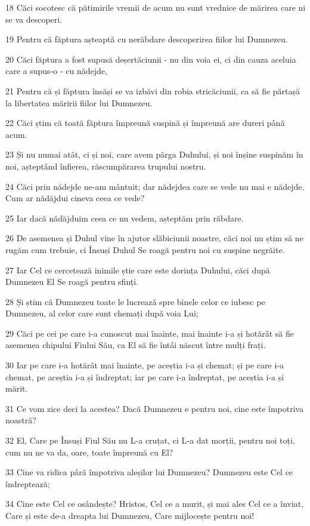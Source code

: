 \par 18 Căci socotesc că pătimirile vremii de acum nu sunt vrednice de mărirea care ni se va descoperi.
\par 19 Pentru că făptura așteaptă cu nerăbdare descoperirea fiilor lui Dumnezeu.
\par 20 Căci făptura a fost supusă deșertăciunii - nu din voia ei, ci din cauza aceluia care a supus-o - cu nădejde,
\par 21 Pentru că și făptura însăși se va izbăvi din robia stricăciunii, ca să fie părtașă la libertatea măririi fiilor lui Dumnezeu.
\par 22 Căci știm că toată făptura împreună suspină și împreună are dureri până acum.
\par 23 Și nu numai atât, ci și noi, care avem pârga Duhului, și noi înșine suspinăm în noi, așteptând înfierea, răscumpărarea trupului nostru.
\par 24 Căci prin nădejde ne-am mântuit; dar nădejdea care se vede nu mai e nădejde. Cum ar nădăjdui cineva ceea ce vede?
\par 25 Iar dacă nădăjduim ceea ce nu vedem, așteptăm prin răbdare.
\par 26 De asemenea și Duhul vine în ajutor slăbiciunii noastre, căci noi nu știm să ne rugăm cum trebuie, ci Însuși Duhul Se roagă pentru noi cu suspine negrăite.
\par 27 Iar Cel ce cercetează inimile știe care este dorința Duhului, căci după Dumnezeu El Se roagă pentru sfinți.
\par 28 Și știm că Dumnezeu toate le lucrează spre binele celor ce iubesc pe Dumnezeu, al celor care sunt chemați după voia Lui;
\par 29 Căci pe cei pe care i-a cunoscut mai înainte, mai înainte i-a și hotărât să fie asemenea chipului Fiului Său, ca El să fie întâi născut între mulți frați.
\par 30 Iar pe care i-a hotărât mai înainte, pe aceștia i-a și chemat; și pe care i-a chemat, pe aceștia i-a și îndreptat; iar pe care i-a îndreptat, pe aceștia i-a și mărit.
\par 31 Ce vom zice deci la acestea? Dacă Dumnezeu e pentru noi, cine este împotriva noastră?
\par 32 El, Care pe Însuși Fiul Său nu L-a cruțat, ci L-a dat morții, pentru noi toți, cum nu ne va da, oare, toate împreună cu El?
\par 33 Cine va ridica pâră împotriva aleșilor lui Dumnezeu? Dumnezeu este Cel ce îndreptează;
\par 34 Cine este Cel ce osândește? Hristos, Cel ce a murit, și mai ales Cel ce a înviat, Care și este de-a dreapta lui Dumnezeu, Care mijlocește pentru noi!
